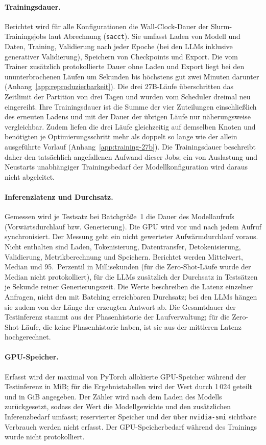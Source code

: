 \paragraph{Trainingsdauer.}
Berichtet wird für alle Konfigurationen die Wall-Clock-Dauer der
Slurm-Trainingsjobs laut Abrechnung (\texttt{sacct}). Sie umfasst Laden
von Modell und Daten, Training, Validierung nach jeder Epoche (bei den
LLMs inklusive generativer Validierung), Speichern von Checkpoints und
Export.
Die vom Trainer zusätzlich protokollierte Dauer ohne Laden und Export
liegt bei den ununterbrochenen Läufen um Sekunden bis höchstens gut zwei
Minuten darunter (Anhang~\ref{app:reproduzierbarkeit}).
Die drei 27B-Läufe überschritten das Zeitlimit der Partition von drei
Tagen und wurden vom Scheduler dreimal neu eingereiht. Ihre
Trainingsdauer ist die Summe der vier Zuteilungen einschließlich des
erneuten Ladens und mit der Dauer der übrigen Läufe nur näherungsweise
vergleichbar.
Zudem liefen die drei Läufe gleichzeitig auf demselben Knoten und benötigten je
Optimierungsschritt mehr als doppelt so lange wie der allein ausgeführte
Vorlauf (Anhang~\ref{app:training-27b}).
Die Trainingsdauer beschreibt daher den tatsächlich angefallenen Aufwand
dieser Jobs; ein von Auslastung und Neustarts unabhängiger
Trainingsbedarf der Modellkonfiguration wird daraus nicht abgeleitet.

\paragraph{Inferenzlatenz und Durchsatz.}
Gemessen wird je Testsatz bei Batchgröße~1 die Dauer des Modellaufrufs
(Vorwärtsdurchlauf bzw. Generierung). Die GPU wird vor und nach jedem
Aufruf synchronisiert.
Der Messung geht ein nicht gewerteter Aufwärmdurchlauf voraus.
Nicht enthalten sind Laden, Tokenisierung, Datentransfer, Detokenisierung,
Validierung, Metrikberechnung und Speichern.
Berichtet werden Mittelwert, Median und 95.~Perzentil in Millisekunden
(für die Zero-Shot-Läufe wurde der Median nicht protokolliert),
für die LLMs zusätzlich der Durchsatz in Testsätzen je Sekunde reiner
Generierungszeit.
Die Werte beschreiben die Latenz einzelner Anfragen, nicht den mit
Batching erreichbaren Durchsatz; bei den LLMs hängen sie zudem von der
Länge der erzeugten Antwort ab.
Die Gesamtdauer der Testinferenz stammt aus der Phasenhistorie der
Laufverwaltung; für die Zero-Shot-Läufe, die keine Phasenhistorie haben,
ist sie aus der mittleren Latenz hochgerechnet.

\paragraph{GPU-Speicher.}
Erfasst wird der maximal von PyTorch allokierte GPU-Speicher während der
Testinferenz in MiB; für die Ergebnistabellen wird der Wert durch
1\,024 geteilt und in GiB angegeben.
Der Zähler wird nach dem Laden des Modells zurückgesetzt, sodass der Wert
die Modellgewichte und den zusätzlichen Inferenzbedarf umfasst;
reservierter Speicher und der über \texttt{nvidia-smi} sichtbare
Verbrauch werden nicht erfasst.
Der GPU-Speicherbedarf während des Trainings wurde nicht protokolliert.

